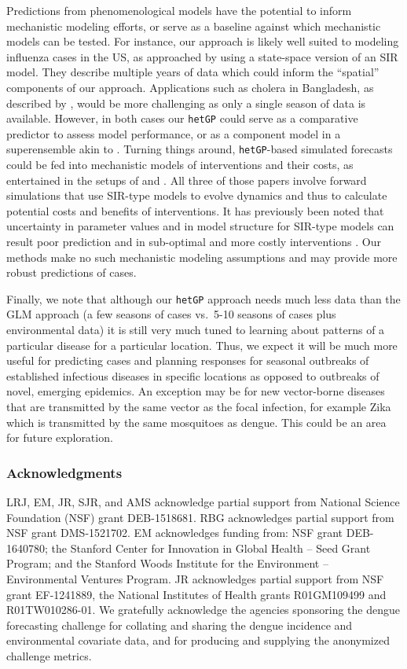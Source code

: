 \documentclass[12pt]{article}
\begin{document}
Predictions from phenomenological models have the potential to inform
mechanistic modeling efforts, or serve as a baseline against which mechanistic
models can be tested. For instance, our approach is likely well suited to
modeling influenza cases in the US, as approached by
\cite{osthus2017forecasting} using a state-space version of an SIR model. They
describe multiple years of data which could inform the ``spatial'' components
of our approach. Applications such as cholera in Bangladesh, as described by
\cite{koepke2016predictive}, would be more challenging as only a single season
of data is available. However, in both cases our {\tt hetGP} could serve as a
comparative predictor to assess model performance, or as a component model in
a superensemble akin to \citet{yamana2016superensemble}. Turning things
around, {\tt hetGP}-based simulated forecasts could be fed into mechanistic
models of interventions and their costs, as entertained in the setups of
\citet{merl:etal:2009,ludkovski:niemi:2010} and \citet{hu2015sequential}.  All
three of those papers involve forward simulations that use SIR-type models to
evolve dynamics and thus to calculate potential costs and benefits of
interventions.  It has previously been noted that uncertainty in parameter
values and in model structure for SIR-type models can result poor prediction
and in sub-optimal and more costly interventions \citep{elderd:etal:2006}. Our
methods make no such mechanistic modeling assumptions and may provide more
robust predictions of cases.

Finally, we note that although our {\tt hetGP} approach needs much less data
than the GLM approach (a few seasons of cases vs.~5-10 seasons of cases plus
environmental data) it is still very much tuned to learning about patterns of
a particular disease for a particular location. Thus, we expect it will be
much more useful for predicting cases and planning responses for seasonal
outbreaks of established infectious diseases in specific locations as opposed
to outbreaks of novel, emerging epidemics. An exception may be for new
vector-borne diseases that are transmitted by the same vector as the focal
infection, for example Zika which is transmitted by the same mosquitoes as
dengue. This could be an area for future exploration.


\subsubsection*{Acknowledgments}

LRJ, EM, JR, SJR, and AMS acknowledge partial support from National Science
Foundation (NSF) grant DEB-1518681. RBG acknowledges partial support from NSF
grant DMS-1521702.  EM acknowledges funding from: NSF grant DEB-1640780; the
Stanford Center for Innovation in Global Health -- Seed Grant Program; and the
Stanford Woods Institute for the Environment -- Environmental Ventures
Program. JR acknowledges partial support from NSF grant EF-1241889, the
National Institutes of Health grants R01GM109499 and R01TW010286-01.
%
We gratefully acknowledge the agencies sponsoring the dengue forecasting
challenge for collating and sharing the dengue incidence and environmental
covariate data, and for producing and supplying the anonymized challenge
metrics.
\end{document}
